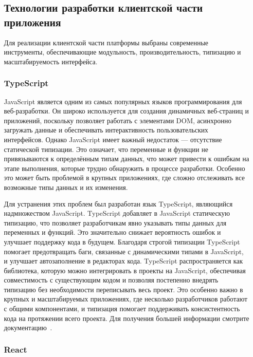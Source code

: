 \subsection{Технологии разработки клиентской части приложения}

Для реализации клиентской части платформы выбраны современные инструменты, обеспечивающие модульность, производительность, типизацию и масштабируемость интерфейса.

\subsubsection{TypeScript}
JavaScript является одним из самых популярных языков программирования для веб-разработки. Он широко используется для создания динамичных веб-страниц и приложений, поскольку позволяет работать с элементами DOM, асинхронно загружать данные и обеспечивать интерактивность пользовательских интерфейсов. Однако JavaScript имеет важный недостаток — отсутствие статической типизации. Это означает, что переменные и функции не привязываются к определённым типам данных, что может привести к ошибкам на этапе выполнения, которые трудно обнаружить в процессе разработки. Особенно это может быть проблемой в крупных приложениях, где сложно отслеживать все возможные типы данных и их изменения.

Для устранения этих проблем был разработан язык TypeScript, являющийся надмножеством JavaScript. TypeScript добавляет в JavaScript статическую типизацию, что позволяет разработчикам явно указывать типы данных для переменных и функций. Это значительно снижает вероятность ошибок и улучшает поддержку кода в будущем. Благодаря строгой типизации TypeScript помогает предотвращать баги, связанные с динамическими типами в JavaScript, и улучшает автозаполнение в редакторах кода. TypeScript распространяется как библиотека, которую можно интегрировать в проекты на JavaScript, обеспечивая совместимость с существующим кодом и позволяя постепенно внедрять типизацию без необходимости переписывать весь проект. Это особенно важно в крупных и масштабируемых приложениях, где несколько разработчиков работают с общими компонентами, и типизация помогает поддерживать консистентность кода на протяжении всего проекта. Для получения большей информации смотрите документацию~\cite{1}.

\subsubsection{React}


